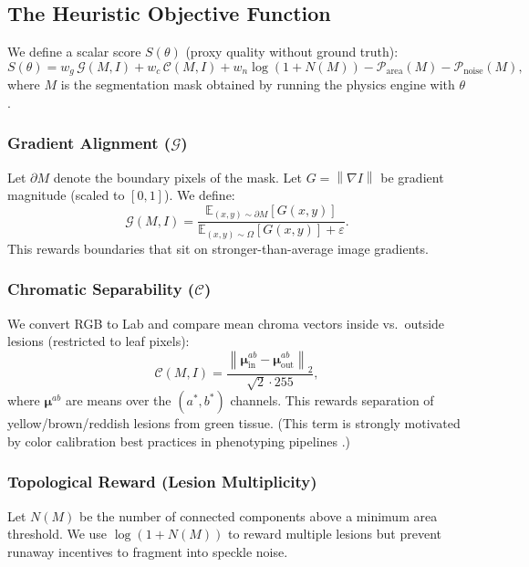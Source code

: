 \documentclass[journal]{IEEEtran}
\newcommand{\E}{\mathbb{E}}
\newcommand{\grad}{\nabla}
\newcommand{\norm}[1]{\left\lVert #1 \right\rVert}
\begin{document}
\subsection{The Heuristic Objective Function}
\label{sec:objective}
We define a scalar score $S(\theta)$ (proxy quality without ground truth):
\begin{equation}
S(\theta) = w_g \,\mathcal{G}(M,I) + w_c \,\mathcal{C}(M,I) + w_n \log(1+N(M))
            - \mathcal{P}_{\mathrm{area}}(M) - \mathcal{P}_{\mathrm{noise}}(M),
\label{eq:objective}
\end{equation}
where $M$ is the segmentation mask obtained by running the physics engine with $\theta$.

\subsubsection{Gradient Alignment ($\mathcal{G}$)}
Let $\partial M$ denote the boundary pixels of the mask. Let $G=\norm{\grad I}$ be gradient magnitude (scaled to $[0,1]$). We define:
\begin{equation}
\mathcal{G}(M,I) = \frac{\E_{(x,y)\sim \partial M}[G(x,y)]}{\E_{(x,y)\sim \Omega}[G(x,y)] + \varepsilon}.
\end{equation}
This rewards boundaries that sit on stronger-than-average image gradients.

\subsubsection{Chromatic Separability ($\mathcal{C}$)}
We convert RGB to Lab and compare mean chroma vectors inside vs.\ outside lesions (restricted to leaf pixels):
\begin{equation}
\mathcal{C}(M,I) = \frac{\norm{\bm{\mu}_{\mathrm{in}}^{ab}-\bm{\mu}_{\mathrm{out}}^{ab}}_2}{\sqrt{2}\cdot 255},
\end{equation}
where $\bm{\mu}^{ab}$ are means over the $(a^\ast,b^\ast)$ channels. This rewards separation of yellow/brown/reddish lesions from green tissue. (This term is strongly motivated by color calibration best practices in phenotyping pipelines \cite{berry2018color,plantcv2025}.)

\subsubsection{Topological Reward (Lesion Multiplicity)}
Let $N(M)$ be the number of connected components above a minimum area threshold. We use $\log(1+N(M))$ to reward multiple lesions but prevent runaway incentives to fragment into speckle noise.
\end{document}
